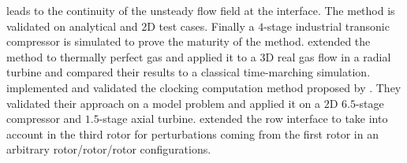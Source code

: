 leads to the continuity of the unsteady flow field at the interface.
The method is validated on analytical and $2$D test cases. Finally
a $4$-stage industrial transonic compressor is simulated to prove the 
maturity of the method.
\citet{Vilmin2007} extended the method to thermally perfect gas and
applied it to a $3$D real gas flow in a radial turbine and compared their
results to a classical time-marching simulation.
\citet{Vilmin2009} implemented and validated the clocking computation method
proposed by \citet{He2002}. They validated their approach on a model problem
and applied it
on a $2$D $6.5$-stage compressor and $1.5$-stage axial turbine.
\citet{Vilmin2013a} extended the row interface to take into
account in the third rotor for perturbations 
coming from the first rotor in an
arbitrary rotor/rotor/rotor configurations.

